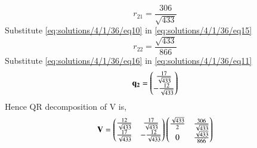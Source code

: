 \begin{equation}\label{eq:solutions/4/1/36/eq15}
	r_{21} = \frac{306}{\sqrt{433}}
\end{equation}
Substitute \eqref{eq:solutions/4/1/36/eq10} in \eqref{eq:solutions/4/1/36/eq15}
\begin{equation}\label{eq:solutions/4/1/36/eq16}
	r_{22} = \frac{\sqrt{433}}{866}
\end{equation}
Substitute \eqref{eq:solutions/4/1/36/eq16} in \eqref{eq:solutions/4/1/36/eq11}
\begin{equation}\label{eq:solutions/4/1/36/eq17}
	\mathbf{q_2} = \begin{pmatrix}\frac{17}{\sqrt{433}} \\ -\frac{12}{\sqrt{433}}\end{pmatrix}
\end{equation}
Hence QR decomposition of V is,
\begin{equation}\label{eq:solutions/4/1/36/eq18}
	\mathbf{V} = \begin{pmatrix}\frac{12}{\sqrt{433}} & \frac{17}{\sqrt{433}}\\
				\frac{17}{\sqrt{433}} & -\frac{12}{\sqrt{433}}\end{pmatrix}
			  \begin{pmatrix}\frac{\sqrt{433}}{2} & \frac{306}{\sqrt{433}}\\
			  0 & \frac{\sqrt{433}}{866}\end{pmatrix}
\end{equation}
